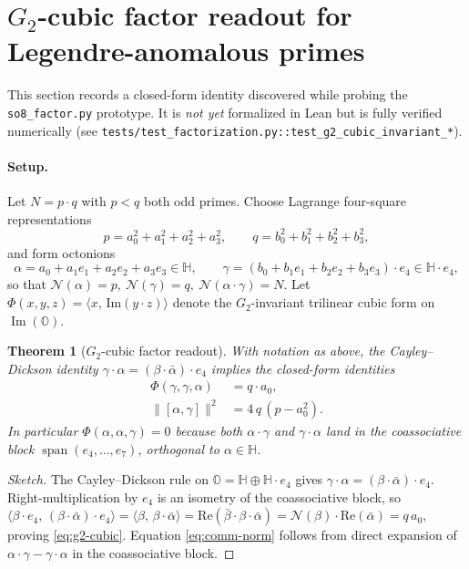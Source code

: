 \documentclass[11pt,a4paper]{article}
\theoremstyle{plain}
\newtheorem{theorem}{Theorem}[section]
\theoremstyle{definition}
\theoremstyle{remark}
\begin{document}
\section{$G_2$-cubic factor readout for Legendre-anomalous primes}
\label{sec:g2-cubic-factor-readout}

This section records a closed-form identity discovered while probing the
\texttt{so8\_factor.py} prototype. It is \emph{not yet} formalized in Lean but is
fully verified numerically (see \texttt{tests/test\_factorization.py::test\_g2\_cubic\_invariant\_*}).

\paragraph{Setup.}
Let $N = p \cdot q$ with $p < q$ both odd primes. Choose Lagrange four-square
representations
\[
p = a_0^2 + a_1^2 + a_2^2 + a_3^2,\qquad
q = b_0^2 + b_1^2 + b_2^2 + b_3^2,
\]
and form octonions
\[
\alpha = a_0 + a_1 e_1 + a_2 e_2 + a_3 e_3 \in \mathbb{H},\qquad
\gamma = (b_0 + b_1 e_1 + b_2 e_2 + b_3 e_3) \cdot e_4 \in \mathbb{H}\!\cdot\!e_4,
\]
so that $\mathcal{N}(\alpha) = p,\ \mathcal{N}(\gamma) = q,\ \mathcal{N}(\alpha\!\cdot\!\gamma) = N$.
Let $\Phi(x,y,z) = \langle x,\, \mathrm{Im}(y\!\cdot\!z)\rangle$ denote the
$G_2$-invariant trilinear cubic form on $\operatorname{Im}(\mathbb{O})$.

\begin{theorem}[$G_2$-cubic factor readout]\label{thm:g2-cubic}
With notation as above, the Cayley--Dickson identity $\gamma\!\cdot\!\alpha = (\beta\!\cdot\!\bar\alpha)\cdot e_4$
implies the closed-form identities
\begin{align}
\Phi(\gamma,\gamma,\alpha) &= q \cdot a_0, \label{eq:g2-cubic}\\
\|[\alpha,\gamma]\|^2 &= 4\,q\,(p - a_0^2). \label{eq:comm-norm}
\end{align}
In particular $\Phi(\alpha,\alpha,\gamma) = 0$ because both $\alpha\!\cdot\!\gamma$ and
$\gamma\!\cdot\!\alpha$ land in the coassociative block $\operatorname{span}(e_4,\ldots,e_7)$,
orthogonal to $\alpha \in \mathbb{H}$.
\end{theorem}

\begin{proof}[Sketch]
The Cayley--Dickson rule on $\mathbb{O} = \mathbb{H} \oplus \mathbb{H}\!\cdot\!e_4$ gives
$\gamma\!\cdot\!\alpha = (\beta\!\cdot\!\bar\alpha)\!\cdot\!e_4$.
Right-multiplication by $e_4$ is an isometry of the coassociative block, so
$\langle \beta\!\cdot\!e_4,\, (\beta\!\cdot\!\bar\alpha)\!\cdot\!e_4\rangle
 = \langle \beta,\, \beta\!\cdot\!\bar\alpha\rangle = \mathrm{Re}(\bar\beta\!\cdot\!\beta\!\cdot\!\bar\alpha)
 = \mathcal{N}(\beta) \cdot \mathrm{Re}(\bar\alpha) = q\, a_0$, proving \eqref{eq:g2-cubic}.
Equation \eqref{eq:comm-norm} follows from direct expansion of
$\alpha\!\cdot\!\gamma - \gamma\!\cdot\!\alpha$ in the coassociative block.
\end{proof}
\end{document}
